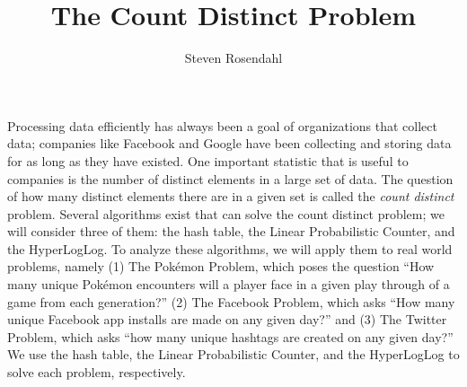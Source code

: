 \documentclass{article}
\title{The Count Distinct Problem}
\author{Steven Rosendahl}
\date{}
\begin{document}
\maketitle
\indent Processing data efficiently has always been a goal of organizations that collect data; companies like Facebook and Google have been collecting and storing data for as long as they have existed.
One important statistic that is useful to companies is the number of distinct elements in a large set of data.
The question of how many distinct elements there are in a given set is called the \textit{count distinct} problem. 
Several algorithms exist that can solve the count distinct problem; we will consider three of them:
the hash table, the Linear Probabilistic Counter, and the HyperLogLog. 
To analyze these algorithms, we will apply them to real world problems, namely (1) The Pok\'emon Problem, which poses the question ``How many unique Pok\'emon encounters will a player face in a given play through of a game from each generation?'' (2) The Facebook Problem, which asks ``How many unique Facebook app installs are made on any given day?'' and (3) The Twitter Problem, which asks ``how many unique hashtags are created on any given day?''
We use the hash table, the Linear Probabilistic Counter, and the HyperLogLog to solve each problem, respectively.\\
\end{document}
